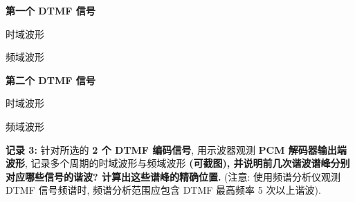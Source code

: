 \documentclass{dspreport}
\begin{document}
\textbf{第一个 DTMF 信号}

时域波形
\begin{block}

\end{block}

\begin{figure}[H]
    \centering
\end{figure}

\begin{block}

\end{block}

频域波形
\begin{block}

\end{block}

\begin{figure}[H]
    \centering
\end{figure}

\begin{block}

\end{block}

\textbf{第二个 DTMF 信号}

时域波形
\begin{block}

\end{block}

\begin{figure}[H]
    \centering
\end{figure}

\begin{block}

\end{block}

频域波形
\begin{block}

\end{block}

\begin{figure}[H]
    \centering
\end{figure}

\begin{block}

\end{block}

\textbf{记录 3:} 针对所选的 \textbf{2 个 DTMF 编码信号}, 用示波器观测 \textbf{PCM 解码器输出端波形}, 记录多个周期的时域波形与频域波形 \textbf{(可截图), 并说明前几次谐波谱峰分别对应哪些信号的谐波? 计算出这些谱峰的精确位置.} (注意: 使用频谱分析仪观测 DTMF 信号频谱时, 频谱分析范围应包含 DTMF 最高频率 5 次以上谐波).
\begin{block}

\end{block}
\end{document}
